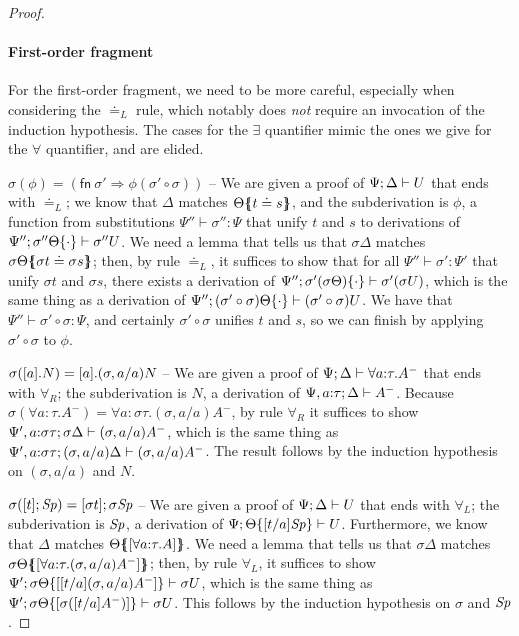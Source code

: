 \begin{proof}
\paragraph{First-order fragment} For the first-order fragment, we need
to be more careful, especially when considering the 
$\doteq_L$ rule, which notably
does {\it not} require an invocation of the induction hypothesis. The cases
for the $\exists$ quantifier mimic the ones we give for the $\forall$
quantifier, and are elided.

$\sigma(\phi) = \left( \mathsf{fn}~\sigma' \Rightarrow \phi (\sigma'
  \circ \sigma) \right)$ -- We are given a proof of
${\Psi};{\Delta} \vdash {U}$ that ends with ${\doteq}_L$; we know that
$\Delta$ matches ${\Theta}\mbox{$\{\hspace{-4pt}\{$}{t \doteq s}\mbox{$\}\hspace{-4pt}\}$}$, and the
subderivation is $\phi$, a function from substitutions 
$\Psi'' \vdash \sigma'' : \Psi$ that unify $t$ and $s$ to derivations
of ${\Psi''};{{\sigma''\Theta}\{{\cdot}\}} \vdash {\sigma''{U}}$. We need a lemma
that tells us that $\sigma\Delta$ matches 
${\sigma\Theta}\mbox{$\{\hspace{-4pt}\{$}{\sigma t \doteq \sigma s}\mbox{$\}\hspace{-4pt}\}$}$; then, by rule
${\doteq}_L$, it suffices to show that for all 
$\Psi'' \vdash \sigma' : \Psi'$ that unify $\sigma t$ and $\sigma s$, 
there exists a derivation of 
${\Psi''};{{\sigma'(\sigma \Theta)}\{{\cdot}\}} \vdash {\sigma'(\sigma U)}$,
which is the same thing as a derivation of 
${\Psi''};{{(\sigma' \circ \sigma) \Theta}\{{\cdot}\}} \vdash {(\sigma' \circ \sigma) U}$. We have that 
$\Psi'' \vdash \sigma' \circ \sigma : \Psi$, and certainly 
$\sigma' \circ \sigma$ unifies $t$ and $s$, so we can finish by
applying $\sigma' \circ \sigma$ to $\phi$.

$\sigma([{a}].{N}) = [{a}].{(\sigma, a/a)N}$ -- We are
given a proof of ${\Psi};{\Delta} \vdash {\forall a{:}\tau.A^-}$ 
that ends with $\forall_R$; the subderivation
is $N$, a derivation of ${\Psi,a{:}\tau};{\Delta} \vdash {A^-}$. Because
$\sigma(\forall{a}{:}{\tau}.A^-) 
 = \forall{a}{:}{\sigma\tau}.(\sigma, a/a){A^-}$,
by rule $\forall_R$ it suffices to show 
${\Psi', a{:}\sigma\tau};{\sigma\Delta} \vdash {(\sigma, a/a)A^-}$, 
which is the same thing
as ${\Psi', a{:}\sigma\tau};{(\sigma, a/a)\Delta} \vdash {(\sigma, a/a)A^-}$.
The result
follows by the induction hypothesis on $(\sigma, a/a)$ and $N$. 

$\sigma([{t}]; {{\it Sp}}) = [{\sigma{t}}]; {\sigma{\it Sp}}$ -- 
We are given a proof of ${\Psi};{\Delta} \vdash {U}$ that ends with 
$\forall_L$; the subderivation is ${\it Sp}$, a derivation of 
${\Psi};{{\Theta}\{{[t/a]{\it Sp}}\}} \vdash {U}$. Furthermore,
we know that $\Delta$ matches ${\Theta}\mbox{$\{\hspace{-4pt}\{$}{[\forall a{:}\tau.A]}\mbox{$\}\hspace{-4pt}\}$}$.
We need a lemma that tells us that $\sigma\Delta$ matches
${\sigma\Theta}\mbox{$\{\hspace{-4pt}\{$}{[\forall a{:}\tau.(\sigma, a/a)A^-]}\mbox{$\}\hspace{-4pt}\}$}$; then,
by rule $\forall_L$, it suffices to show 
${\Psi'};{{\sigma\Theta}\{{[[t/a](\sigma, a/a)A^-]}\}} \vdash {\sigma{U}}$, which is the same thing as
${\Psi'};{{\sigma\Theta}\{{[\sigma([t/a]A^-)]}\}} \vdash {\sigma{U}}$. This follows by the induction hypothesis on $\sigma$ and
${\it Sp}$.


\end{proof}
